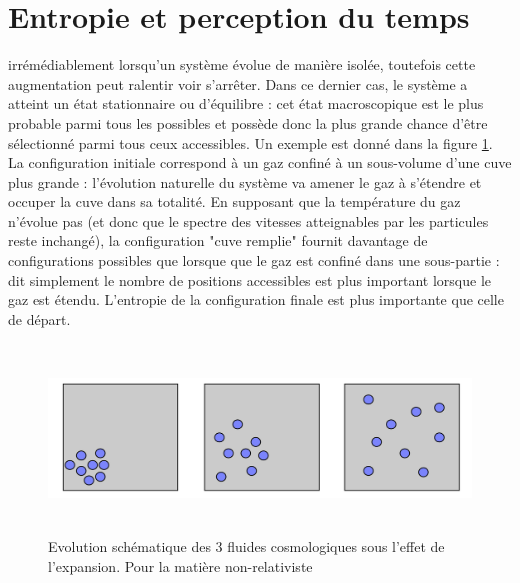 \section{Entropie et perception du temps}

 irrémédiablement lorsqu'un système évolue de manière isolée, toutefois cette augmentation peut ralentir voir s'arrêter. Dans ce dernier cas, le système a atteint un état stationnaire ou d'équilibre : cet état macroscopique est le plus probable parmi tous les possibles et possède donc la plus grande chance d'être sélectionné parmi tous ceux accessibles. Un exemple est donné dans la figure \ref{f:equi}. La configuration initiale correspond à un gaz confiné à un sous-volume d'une cuve plus grande : l'évolution naturelle du système va amener le gaz à s'étendre et occuper la cuve dans sa totalité. En supposant que la température du gaz n'évolue pas (et donc que le spectre des vitesses atteignables par les particules reste inchangé), la configuration "cuve remplie" fournit davantage de configurations possibles que lorsque que le gaz est confiné dans une sous-partie : dit simplement le nombre de positions accessibles est plus important lorsque le gaz est étendu. L'entropie de la configuration finale est plus importante que celle de départ. 
\begin{figure}[htbp]
	\centering
		\includegraphics[height=5cm]{figs/equiconfig.png}
	\caption{Evolution schématique des 3 fluides cosmologiques sous l'effet de l'expansion. Pour la matière non-relativiste}
	\label{f:equi}
\end{figure}

